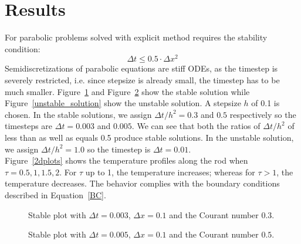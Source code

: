 \documentclass{article}
\begin{document}
\section{Results}

For parabolic problems solved with explicit method requires the stability condition:
\begin{equation}
    \Delta t \leq 0.5 \cdot \Delta x^2
\end{equation}
Semidiscretizations of parabolic equations are stiff ODEs, as the timestep is severely restricted, i.e. since stepsize is already small, the timestep has to be much smaller. Figure~\ref{stable_solution_0} and Figure~\ref{stable_solution} show the stable solution while Figure~\ref{unstable_solution} show the unstable solution. A stepsize $h$ of 0.1 is chosen. In the stable solutions, we assign $\Delta t / h^2 = 0.3$ and $0.5$ respectively so the timesteps are $\Delta t =  0.003$ and $0.005$. We can see that both the ratios of $\Delta t / h^2$ of less than as well as equals 0.5 produce stable solutions. In the unstable solution, we assign $\Delta t / h^2 = 1.0$ so the timestep is $\Delta t =  0.01$.  \\ 

\noindent
Figure~\ref{2dplots} shows the temperature profiles along the rod when $\tau = 0.5, 1, 1.5, 2$. For $\tau$ up to 1, the temperature increases; whereas for $\tau > 1$, the temperature decreases. The behavior complies with the boundary conditions described in Equation~\ref{BC}.

\begin{figure}
  \centering
  \caption{Stable plot with $\Delta t = 0.003$, $\Delta x = 0.1$ and the
    Courant number $0.3$.}
    \label{stable_solution_0}
\end{figure}

\begin{figure}
  \centering
  \caption{Stable plot with $\Delta t = 0.005$, $\Delta x = 0.1$ and the
    Courant number $0.5$.}
    \label{stable_solution}
\end{figure}
\end{document}
